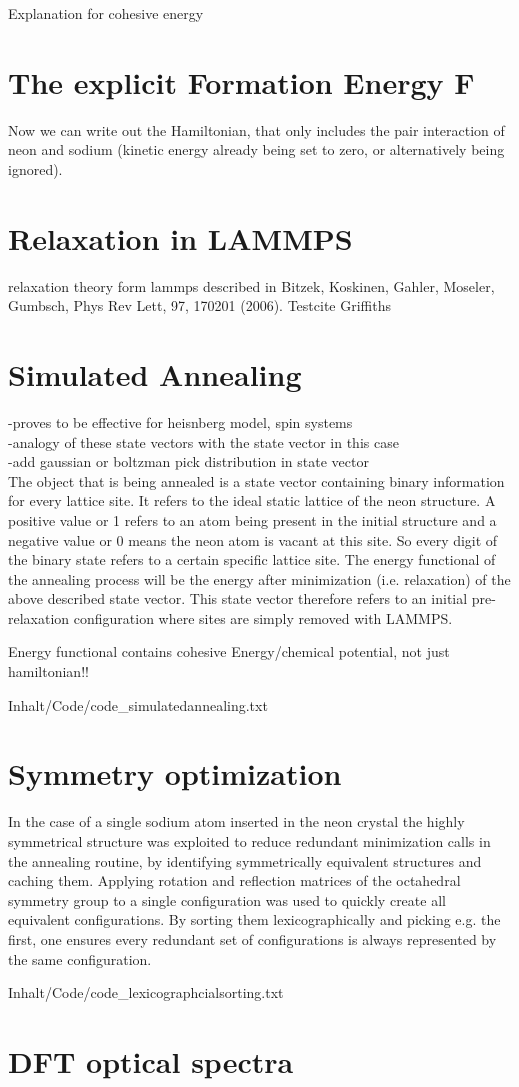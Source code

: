 Explanation for cohesive energy
\section{The explicit Formation Energy F}
Now we can write out the Hamiltonian, that only includes the pair interaction of neon and sodium (kinetic energy already being set to zero, or alternatively being ignored).
\section{Relaxation in LAMMPS}
relaxation theory form lammps 
described in \cite{Bitzek2006} Bitzek, Koskinen, Gahler, Moseler, Gumbsch, Phys Rev Lett, 97, 170201 (2006).
Testcite Griffiths\cite{griffithsQM}
 
\section{Simulated Annealing}
-proves to be effective for heisnberg model, spin systems\\
-analogy of these state vectors with the state vector in this case\\
-add gaussian or boltzman pick distribution in state vector\\
The object that is being annealed is a state vector containing binary information for every lattice site. It refers to the ideal static lattice of the neon structure. A positive value or 1 refers to an atom being present in the initial structure and a negative value or 0 means the neon atom is vacant at this site. So every digit of the binary state refers to a certain specific lattice site. The energy functional of the annealing process will be the energy after minimization (i.e. relaxation) of the above described state vector. This state vector therefore refers to an initial pre-relaxation configuration where sites are simply removed with \ac{LAMMPS}.

Energy functional contains cohesive Energy/chemical potential, not just hamiltonian!!

{Inhalt/Code/code_simulatedannealing.txt}

\section{Symmetry optimization} 
In the case of a single sodium atom inserted in the neon crystal the highly symmetrical structure was exploited to reduce redundant minimization calls in the annealing routine, by identifying symmetrically equivalent structures and caching them. Applying rotation and reflection matrices of the octahedral symmetry group to a single configuration was used to quickly create all equivalent configurations. By sorting them lexicographically and picking e.g. the first, one ensures every redundant set of configurations is always represented by the same configuration.


{Inhalt/Code/code_lexicographcialsorting.txt} 

\section{DFT optical spectra}






%